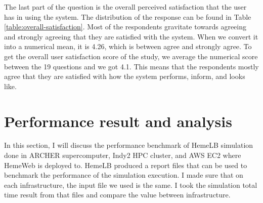 \begin{center}
\label{table:overall-satisfaction}
\end{center}
\vspace{1cm}

The last part of the question is the overall perceived satisfaction that the user has in using the system. The distribution of the response can be found in Table \ref{table:overall-satisfaction}. Most of the respondents gravitate towards agreeing and strongly agreeing that they are satisfied with the system. When we convert it into a numerical mean, it is 4.26, which is between agree and strongly agree. To get the overall user satisfaction score of the study, we average the numerical score between the 19 questions and we got 4.1. This means that the respondents mostly agree that they are satisfied with how the system performs, inform, and looks like.

\section{Performance result and analysis}

In this section, I will discuss the performance benchmark of HemeLB simulation done in ARCHER supercomputer, Indy2 HPC cluster, and AWS EC2 where HemeWeb is deployed to. HemeLB produced a report files that can be used to benchmark the performance of the simulation execution. I made sure that on each infrastructure, the input file we used is the same. I took the simulation total time result from that files and compare the value between infrastructure.



